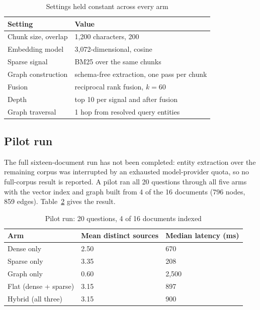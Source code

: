 \documentclass[conference]{IEEEtran}
\newcommand{\tbl}{\footnotesize}
\begin{document}
\begin{table}[t]
\caption{Settings held constant across every arm}
\label{tab:settings}
\centering
\tbl
\begin{tabular}{@{}p{}p{}@{}}
\toprule
\textbf{Setting} & \textbf{Value} \\
\midrule
Chunk size, overlap & 1{,}200 characters, 200 \\
Embedding model & 3{,}072-dimensional, cosine \\
Sparse signal & BM25 over the same chunks \\
Graph construction & schema-free extraction, one pass per chunk \\
Fusion & reciprocal rank fusion, $k = 60$ \\
Depth & top 10 per signal and after fusion \\
Graph traversal & 1 hop from resolved query entities \\
\bottomrule
\end{tabular}
\end{table}

\subsection{Pilot run}
\label{sec:retrieval-results}
The full sixteen-document run has not been completed: entity extraction over the remaining corpus was interrupted by an exhausted model-provider quota, so no full-corpus result is reported. A pilot ran all 20 questions through all five arms with the vector index and graph built from 4 of the 16 documents (796 nodes, 859 edges). Table~\ref{tab:pilot} gives the result.

\begin{table}[t]
\caption{Pilot run: 20 questions, 4 of 16 documents indexed}
\label{tab:pilot}
\centering
\tbl
\begin{tabular}{@{}p{}p{}p{}@{}}
\toprule
\textbf{Arm} & \textbf{Mean distinct sources} & \textbf{Median latency (ms)} \\
\midrule
Dense only & 2.50 & 670 \\
Sparse only & 3.35 & 208 \\
Graph only & 0.60 & 2{,}500 \\
Flat (dense + sparse) & 3.15 & 897 \\
Hybrid (all three) & 3.15 & 900 \\
\bottomrule
\end{tabular}
\end{table}
\end{document}
